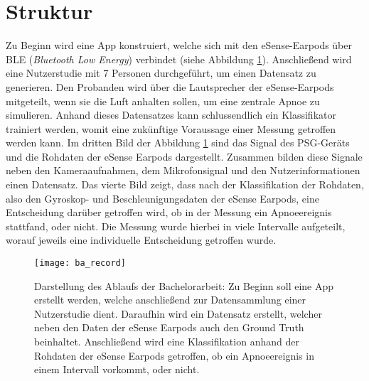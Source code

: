 \section{Struktur}
Zu Beginn wird eine App konstruiert, welche sich mit den eSense-Earpods über BLE (\textit{Bluetooth Low Energy}) verbindet (siehe Abbildung \ref{introduction:ba_record}).
Anschließend wird eine Nutzerstudie mit 7 Personen durchgeführt, um einen Datensatz zu generieren.
Den Probanden wird über die Lautsprecher der eSense-Earpods mitgeteilt, wenn sie die Luft anhalten sollen, um eine zentrale Apnoe zu simulieren.
Anhand dieses Datensatzes kann schlussendlich ein Klassifikator trainiert werden, womit eine zukünftige Voraussage einer Messung getroffen werden kann.
Im dritten Bild der Abbildung \ref{introduction:ba_record} sind das Signal des PSG-Geräts und die Rohdaten der eSense Earpods dargestellt. 
Zusammen bilden diese Signale neben den Kameraaufnahmen, dem Mikrofonsignal und den Nutzerinformationen einen Datensatz.
Das vierte Bild zeigt, dass nach der Klassifikation der Rohdaten, also den Gyroskop- und Beschleunigungsdaten der eSense Earpods, eine Entscheidung darüber getroffen wird, ob in der Messung ein Apnoeereignis stattfand, oder nicht.
Die Messung wurde hierbei in viele Intervalle aufgeteilt, worauf jeweils eine individuelle Entscheidung getroffen wurde.

\begin{figure}[h]
  \centering
  \texttt{[image: ba\_record]}
  \caption{Darstellung des Ablaufs der Bachelorarbeit: Zu Beginn soll eine App erstellt werden, welche anschließend zur Datensammlung einer Nutzerstudie dient. Daraufhin wird ein Datensatz erstellt, welcher neben den Daten der eSense Earpods auch den Ground Truth beinhaltet. Anschließend wird eine Klassifikation anhand der Rohdaten der eSense Earpods getroffen, ob ein Apnoeereignis in einem Intervall vorkommt, oder nicht.}
  \label{introduction:ba_record}
\end{figure}